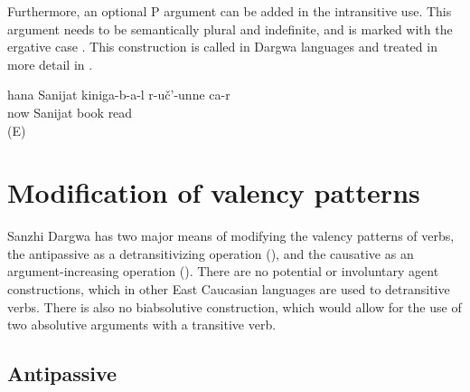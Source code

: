 Furthermore, an optional P argument can be added in the intransitive use. This argument needs to be semantically plural and indefinite, and is marked with the ergative case . This construction is called  in Dargwa languages and treated in more detail in . 
%
\begin{exe}
	\ex	\label{ex:Now Sanijat reads books}
	\gll	hana Sanijat kiniga-b-a-l	r-uč'-unne	ca-r\\
		now	Sanijat	book	read	\\
	\glt	{} (E)
\end{exe}


\section{Modification of valency patterns}
\label{cpt:Modification of valency patterns}

Sanzhi Dargwa has two major means of modifying the valency patterns of verbs, the antipassive as a detransitivizing operation (), and the causative as an argument-increasing operation (). There are no potential or involuntary agent constructions, which in other East Caucasian languages are used to detransitive verbs. There is also no biabsolutive construction, which would allow for the use of two absolutive arguments with a transitive verb.



\subsection{Antipassive}
\label{sec:Antipassive}

